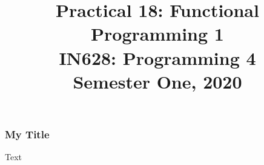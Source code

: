 \documentclass[10pt]{beamer}
\author{}
\title{Practical 18: Functional Programming 1\\IN628: Programming 4\\Semester One, 2020}
\institute{Otago Polytechnic, Dunedin, New Zealand}
\date{}
\begin{document}
\begin{frame}
	\titlepage
\end{frame}

\begin{frame}
	\frametitle{My Title} 
	Text
\end{frame}
  
\end{document}
